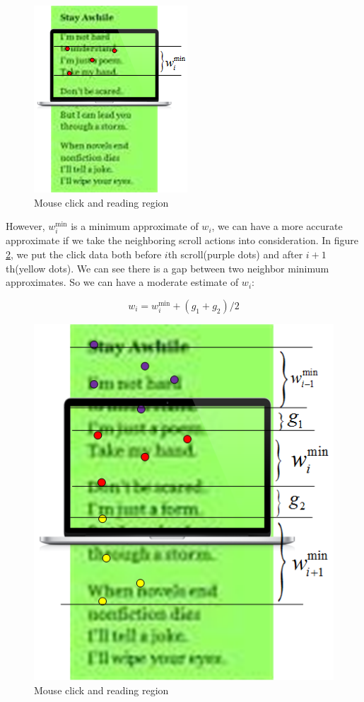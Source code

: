 \documentclass{sigchi}
\begin{document}
\begin{figure}[!h]
\centering
\includegraphics[width=0.7\columnwidth]{pictures/single_click}
\caption{Mouse click and reading region}
\label{fig:single_click}
\end{figure}

However, $w_i^{\min }$ is a minimum approximate of $w_i$, we can have a more accurate approximate if we take the neighboring 
scroll actions into consideration. In figure \ref{fig:neighbor_scroll}, we put the click data both before $i$th scroll(purple dots) and after $i+1$th(yellow dots).
We can see there is a gap between two neighbor minimum approximates. So we can have a moderate estimate of $w_i$:

\begin{equation} \label{eq:4}
{w_i} = w_i^{\min } + ({g_1} + {g_2})/2
\end{equation}
 
\begin{figure}[!h]
\centering
\includegraphics[width=0.9\columnwidth]{pictures/neighbor-scroll}
\caption{Mouse click and reading region}
\label{fig:neighbor_scroll}
\end{figure}




\end{document}
